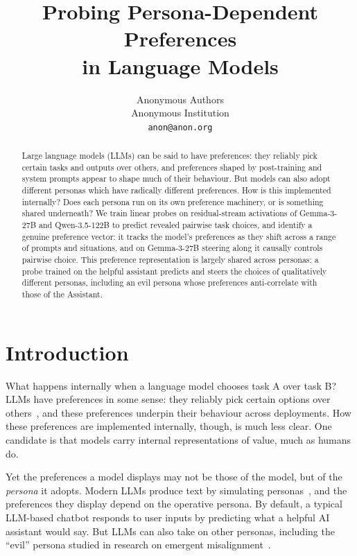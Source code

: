 \documentclass{article}
\title{Probing Persona-Dependent Preferences\\ in Language Models}
\author{%
  Anonymous Authors \\
  Anonymous Institution \\
  \texttt{anon@anon.org}
}
\begin{document}
\raggedbottom  %

\maketitle

\begin{abstract}
  Large language models (LLMs) can be said to have preferences: they reliably pick certain tasks and outputs over others, and preferences shaped by post-training and system prompts appear to shape much of their behaviour. But models can also adopt different personas which have radically different preferences. How is this implemented internally? Does each persona run on its own preference machinery, or is something shared underneath? We train linear probes on residual-stream activations of Gemma-3-27B and Qwen-3.5-122B to predict revealed pairwise task choices, and identify a genuine preference vector: it tracks the model's preferences as they shift across a range of prompts and situations, and on Gemma-3-27B steering along it causally controls pairwise choice. This preference representation is largely shared across personas: a probe trained on the helpful assistant predicts and steers the choices of qualitatively different personas, including an evil persona whose preferences anti-correlate with those of the Assistant. 
\end{abstract}
\section{Introduction}
\label{sec:intro}

What happens internally when a language model chooses task A over task B? LLMs have preferences in some sense: they reliably pick certain options over others~\citep{mazeika2025utility}, and these preferences underpin their behaviour across deployments. How these preferences are implemented internally, though, is much less clear. One candidate is that models carry internal representations of value, much as humans do.

Yet the preferences a model displays may not be those of the model, but of the \emph{persona} it adopts. Modern LLMs produce text by simulating personas~\citep{janus2022simulators,beckmann2026individuation,marks2026personaselection}, and the preferences they display depend on the operative persona. By default, a typical LLM-based chatbot responds to user inputs by predicting what a helpful AI assistant would say. But LLMs can also take on other personas, including the ``evil'' persona studied in research on emergent misalignment~\citep{betley2025emergent}.
\end{document}
